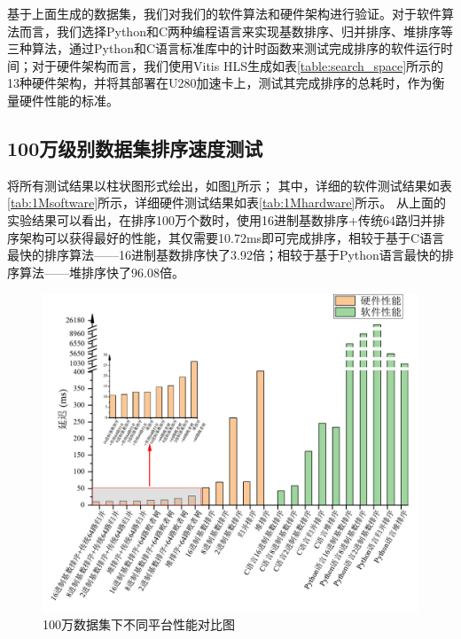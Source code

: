 基于上面生成的数据集，我们对我们的软件算法和硬件架构进行验证。对于软件算法而言，我们选择Python和C两种编程语言来实现基数排序、归并排序、堆排序等三种算法，通过Python和C语言标准库中的计时函数来测试完成排序的软件运行时间；对于硬件架构而言，我们使用Vitis HLS生成如表\ref{table:search_space}所示的13种硬件架构，并将其部署在U280加速卡上，测试其完成排序的总耗时，作为衡量硬件性能的标准。

\subsection{100万级别数据集排序速度测试}
将所有测试结果以柱状图形式绘出，如图\ref{fig:1MComparison}所示；
其中，详细的软件测试结果如表\ref{tab:1Msoftware}所示，详细硬件测试结果如表\ref{tab:1Mhardware}所示。
从上面的实验结果可以看出，在排序100万个数时，使用16进制基数排序+传统64路归并排序架构可以获得最好的性能，其仅需要10.72ms即可完成排序，相较于基于C语言最快的排序算法——16进制基数排序快了3.92倍；相较于基于Python语言最快的排序算法——堆排序快了96.08倍。

\begin{figure}[htbp]
    \centering
    \includegraphics[width=\linewidth]{figures/1MComparison.pdf}
    \caption{100万数据集下不同平台性能对比图}
    \label{fig:1MComparison}
\end{figure}


